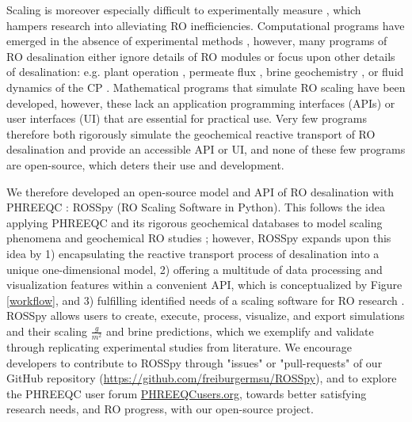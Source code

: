 Scaling is moreover especially difficult to experimentally measure \cite{Hu2014Real-timeSpectroscopy,Butt1995IdentificationAutopsy,Sheikholeslami2003KineticsM}, which hampers research into alleviating RO inefficiencies. Computational programs \cite{Giere2009IsExperimentation,Wijmans1995TheReview} have emerged in the absence of experimental methods \cite{Strubbe2018CalibrationFull-Scale,Lenhard2007ComputerModeling}, however, many programs of RO desalination either ignore details of RO modules \cite{2018ZeroPHREEQC} or focus upon other details of desalination: e.g. plant operation \cite{DesalitechROSASoftware,Chee2018PerformanceSoftware,SysCAD2020PHREEQCUnit,Bouchareb2019ExperimentalDesalination}, permeate flux \cite{Xu2012TOUGHREACT.0,Steefel2015ReactiveSimulation}, brine geochemistry \cite{Kundu2018TechnicalTechnology}, or fluid dynamics of the CP \cite{Walker2003AssessmentReaction}. Mathematical programs that simulate RO scaling  have been developed, however, these lack an application programming interfaces (APIs) or user interfaces (UI) \cite{Radu2014ASystems,Karabelas2019PredictionSimulator} that are essential for practical use. Very few programs \cite{SoftwareReverseOsmosis} therefore both rigorously simulate the geochemical reactive transport of RO desalination and provide an accessible API or UI, and none of these few programs are open-source, which deters their use and development. 

We therefore developed an open-source model and API of RO desalination with PHREEQC \cite{Parkhurst2015PhreeqcRM:PHREEQC,Charlton2011ModulesLanguages}: ROSSpy (RO Scaling Software in Python). This follows the idea applying PHREEQC and its rigorous geochemical databases to model scaling phenomena \cite{Mitrouli2016CalciumExperiments,Warsinger2018InorganicOsmosis} and geochemical RO studies \cite{Bein1993OriginBrine,Wilson1993GeochemistryFormations,Casas2012SeawaterElectrodialysis,Yan2017ReverseVelocity}; however, ROSSpy expands upon this idea by 1) encapsulating the reactive transport process of desalination into a unique one-dimensional model, 2) offering a multitude of data processing and visualization features within a convenient API, which is conceptualized by Figure \ref{workflow}, and 3) fulfilling identified needs of a scaling software for RO research \cite{Karabelas2020ScalingTools}. ROSSpy allows users to create, execute, process, visualize, and export simulations and their scaling $\frac{g}{m^2}$ and brine predictions, which we exemplify and validate through replicating experimental studies from literature. We encourage developers to contribute to ROSSpy through "issues" or "pull-requests" of our GitHub repository (\url{https://github.com/freiburgermsu/ROSSpy}), and to explore the PHREEQC user forum \url{PHREEQCusers.org}, towards better satisfying research needs, and RO progress, with our open-source project. 


